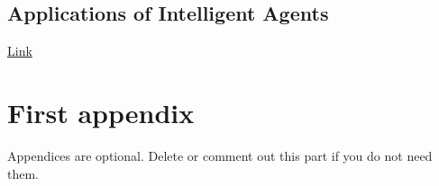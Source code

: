 \documentclass[journal]{IEEEtran}
\begin{document}
\subsection{Applications of Intelligent Agents\cite{jennings1998applications}}
\href{ftp://143.106.148.79/pub/docs/gudwin/ia009/jennings98applications.pdf}{Link}





\appendices
\section{First appendix}
Appendices are optional. Delete or comment out this part if you do not need them.

\end{document}
